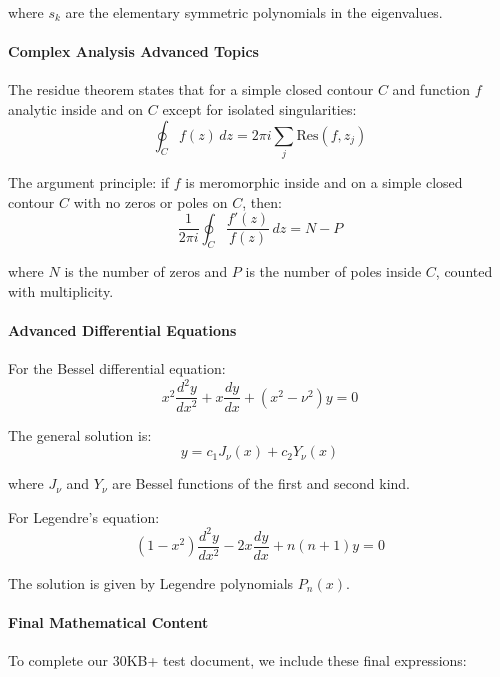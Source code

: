 \documentclass[12pt]{article}
\begin{document}
where $s_k$ are the elementary symmetric polynomials in the eigenvalues.

\paragraph{Complex Analysis Advanced Topics}

The residue theorem states that for a simple closed contour $C$ and function $f$ analytic inside and on $C$ except for isolated singularities:
\begin{equation}
\oint_C f(z) \, dz = 2\pi i \sum_{j} \text{Res}(f, z_j)
\end{equation}

The argument principle: if $f$ is meromorphic inside and on a simple closed contour $C$ with no zeros or poles on $C$, then:
\begin{equation}
\frac{1}{2\pi i} \oint_C \frac{f'(z)}{f(z)} \, dz = N - P
\end{equation}

where $N$ is the number of zeros and $P$ is the number of poles inside $C$, counted with multiplicity.

\paragraph{Advanced Differential Equations}

For the Bessel differential equation:
\begin{equation}
x^2 \frac{d^2y}{dx^2} + x \frac{dy}{dx} + (x^2 - \nu^2) y = 0
\end{equation}

The general solution is:
\begin{equation}
y = c_1 J_\nu(x) + c_2 Y_\nu(x)
\end{equation}

where $J_\nu$ and $Y_\nu$ are Bessel functions of the first and second kind.

For Legendre's equation:
\begin{equation}
(1-x^2) \frac{d^2y}{dx^2} - 2x \frac{dy}{dx} + n(n+1) y = 0
\end{equation}

The solution is given by Legendre polynomials $P_n(x)$.

\paragraph{Final Mathematical Content}

To complete our 30KB+ test document, we include these final expressions:
\end{document}
